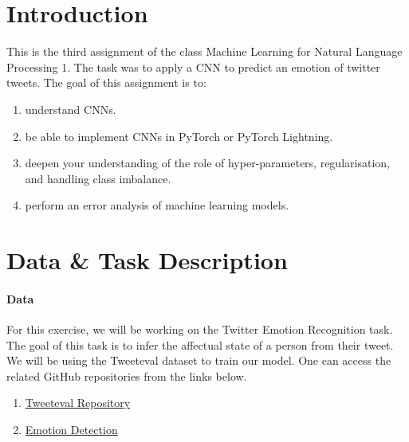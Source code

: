 \documentclass[fleqn,10pt]{SelfArx} %
\begin{document}
\maketitle %

\tableofcontents %

\thispagestyle{empty} %


\section{Introduction} %

This is the third assignment of the class Machine Learning for Natural Language Processing 1. The task was to apply a CNN to predict an emotion of twitter tweets. The goal of this assignment is to:
\begin{enumerate}[noitemsep]
    \item understand CNNs.
    \item be able to implement CNNs in PyTorch or PyTorch Lightning.
    \item deepen your understanding of the role of hyper-parameters, regularisation, and handling class imbalance.
    \item perform an error analysis of machine learning models.
\end{enumerate}

\section{Data \& Task Description}

\paragraph{Data} 
For this exercise, we will be working on the Twitter Emotion Recognition task. The goal of this task is to infer the affectual state of a person from their tweet. We will be using the Tweeteval dataset to train our model. One can access the related GitHub repositories from the links below.
\begin{enumerate}[noitemsep]
    \item \href{https://github.com/cardiffnlp/tweeteval}{Tweeteval Repository}
    \item \href{https://github.com/cardiffnlp/tweeteval/tree/main/datasets/emotion}{Emotion Detection}
\end{enumerate} 
\end{document}
